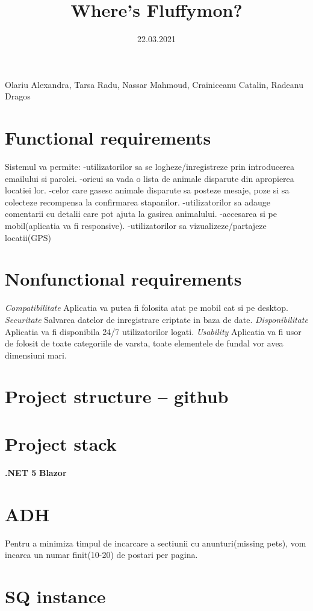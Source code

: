 \documentclass[a4paper,12pt]{article}
\begin{document}
\title{Where's Fluffymon?}
\date{ 22.03.2021}
\maketitle
\begin{center}
Olariu Alexandra, Tarsa Radu, Nassar Mahmoud, Crainiceanu Catalin,  Radeanu Dragos
\end{center}
\section{Functional requirements}
Sistemul va permite:
\newline
-utilizatorilor sa se logheze/inregistreze prin introducerea emailului si parolei.\newline
-oricui sa  vada o lista de animale disparute din apropierea locatiei lor.
\newline
-celor care gasesc animale disparute sa posteze mesaje, poze si sa colecteze recompensa la confirmarea stapanilor.
\newline
-utilizatorilor sa adauge comentarii cu detalii care pot ajuta la gasirea animalului.
\newline
-accesarea si pe mobil(aplicatia va fi responsive).
\newline
-utilizatorilor sa vizualizeze/partajeze locatii(GPS)

\section{Nonfunctional requirements}
\emph{Compatibilitate}\newline
Aplicatia va putea fi folosita atat pe mobil cat si pe desktop.
\newline
\emph{Securitate}\newline
Salvarea datelor de inregistrare criptate in baza de date.
\newline
\emph{Disponibilitate}\newline
Aplicatia va fi disponibila 24/7 utilizatorilor logati.
\newline
\emph{Usability}\newline
Aplicatia va fi usor de folosit de toate categoriile de varsta, toate elementele de fundal vor avea dimensiuni mari.
\section{Project structure – github}
\section{Project stack}
\textbf{.NET 5}\newline
\textbf{ Blazor}
\section{ADH}
Pentru a minimiza timpul de incarcare a sectiunii cu anunturi(missing pets), vom incarca un numar finit(10-20) de postari per pagina.\newline

\section{SQ instance}
\end{document}
